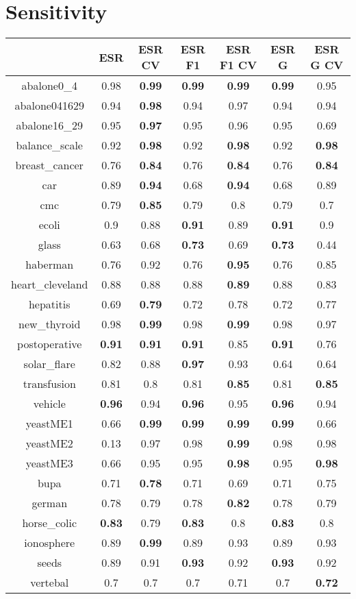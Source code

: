 \documentclass{article}%
\begin{document}
%
\normalsize%
\section*{Sensitivity}%
\begin{tabular}{c|cccccc}%
\hline%
&ESR&ESR CV&ESR F1&ESR F1 CV&ESR G&ESR G CV\\%
\hline%
abalone0\_4&0.98&\textbf{0.99}&\textbf{0.99}&\textbf{0.99}&\textbf{0.99}&0.95\\%
\hline%
abalone041629&0.94&\textbf{0.98}&0.94&0.97&0.94&0.94\\%
\hline%
abalone16\_29&0.95&\textbf{0.97}&0.95&0.96&0.95&0.69\\%
\hline%
balance\_scale&0.92&\textbf{0.98}&0.92&\textbf{0.98}&0.92&\textbf{0.98}\\%
\hline%
breast\_cancer&0.76&\textbf{0.84}&0.76&\textbf{0.84}&0.76&\textbf{0.84}\\%
\hline%
car&0.89&\textbf{0.94}&0.68&\textbf{0.94}&0.68&0.89\\%
\hline%
cmc&0.79&\textbf{0.85}&0.79&0.8&0.79&0.7\\%
\hline%
ecoli&0.9&0.88&\textbf{0.91}&0.89&\textbf{0.91}&0.9\\%
\hline%
glass&0.63&0.68&\textbf{0.73}&0.69&\textbf{0.73}&0.44\\%
\hline%
haberman&0.76&0.92&0.76&\textbf{0.95}&0.76&0.85\\%
\hline%
heart\_cleveland&0.88&0.88&0.88&\textbf{0.89}&0.88&0.83\\%
\hline%
hepatitis&0.69&\textbf{0.79}&0.72&0.78&0.72&0.77\\%
\hline%
new\_thyroid&0.98&\textbf{0.99}&0.98&\textbf{0.99}&0.98&0.97\\%
\hline%
postoperative&\textbf{0.91}&\textbf{0.91}&\textbf{0.91}&0.85&\textbf{0.91}&0.76\\%
\hline%
solar\_flare&0.82&0.88&\textbf{0.97}&0.93&0.64&0.64\\%
\hline%
transfusion&0.81&0.8&0.81&\textbf{0.85}&0.81&\textbf{0.85}\\%
\hline%
vehicle&\textbf{0.96}&0.94&\textbf{0.96}&0.95&\textbf{0.96}&0.94\\%
\hline%
yeastME1&0.66&\textbf{0.99}&\textbf{0.99}&\textbf{0.99}&\textbf{0.99}&0.66\\%
\hline%
yeastME2&0.13&0.97&0.98&\textbf{0.99}&0.98&0.98\\%
\hline%
yeastME3&0.66&0.95&0.95&\textbf{0.98}&0.95&\textbf{0.98}\\%
\hline%
bupa&0.71&\textbf{0.78}&0.71&0.69&0.71&0.75\\%
\hline%
german&0.78&0.79&0.78&\textbf{0.82}&0.78&0.79\\%
\hline%
horse\_colic&\textbf{0.83}&0.79&\textbf{0.83}&0.8&\textbf{0.83}&0.8\\%
\hline%
ionosphere&0.89&\textbf{0.99}&0.89&0.93&0.89&0.93\\%
\hline%
seeds&0.89&0.91&\textbf{0.93}&0.92&\textbf{0.93}&0.92\\%
\hline%
vertebal&0.7&0.7&0.7&0.71&0.7&\textbf{0.72}\\%
\hline%
\end{tabular}
\end{document}
